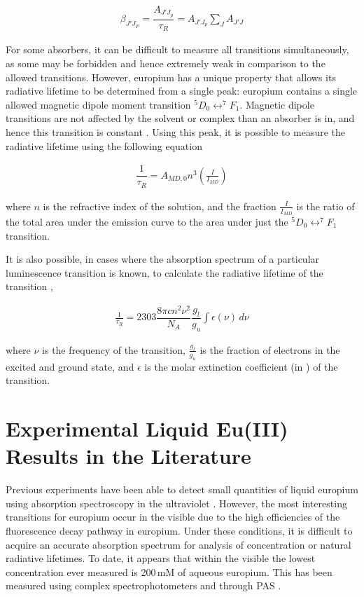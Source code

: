 \begin{align}
  \beta_{J'J_P} = \dfrac{A_{J'J_p}}{\tau_R} = A_{J'J_p}\sum_J A_{J'J} \label{eq:branch_ratio}
\end{align}

For some absorbers, it can be difficult to measure all transitions
simultaneously, as some may be forbidden and hence extremely weak in comparison
to the allowed transitions. However, europium has a unique property that allows
its radiative lifetime to be determined from a single peak: europium contains a
single allowed magnetic dipole moment transition $^5D_0 \leftrightarrow ^7F_1$.
Magnetic dipole transitions are not affected by the solvent or complex than an
absorber is in, and hence this transition is constant \cite{Werts:2002fs}.
Using this peak, it is possible to measure the radiative lifetime using the
following equation

\begin{align}
  \dfrac{1}{\tau_R} = A_{MD,0}n^3\left(\frac{I}{I_{MD}}\right) \label{eq:nat_life_eu}
\end{align}

where $n$ is the refractive index of the solution, and the fraction
$\frac{I}{I_{MD}}$ is the ratio of the total area under the emission curve to
the area under just the $^5D_0 \leftrightarrow ^7F_1$ transition.

It is also possible, in cases where the absorption spectrum of a particular
luminescence transition is known, to calculate the radiative lifetime of the
transition \cite{Lewis:1945tp},

\begin{align}
  \frac{1}{\tau_R} = 2303 \dfrac{8\pi c n ^2 \nu^2}{N_A}\dfrac{g_l}{g_u}\int\epsilon(\nu)\,d\nu \label{eq:nat_life_abs}
\end{align}

where $\nu$ is the frequency of the transition, $\tfrac{g_l}{g_u}$ is the
fraction of electrons in the excited and ground state, and $\epsilon$ is the
molar extinction coefficient (in \iM\icm) of the transition.



\section{Experimental Liquid Eu(III) Results in the Literature}\label{sec:previous_eu_results}

Previous experiments have been able to detect small quantities of liquid
europium using absorption spectroscopy in the ultraviolet \cite{Yun:2001wc}.
However, the most interesting transitions for europium occur in the visible due
to the high efficiencies of the fluorescence decay pathway in europium. Under
these conditions, it is difficult to acquire an accurate absorption spectrum
for analysis of concentration or natural radiative lifetimes. To date, it
appears that within the visible the lowest concentration ever measured is
200\,mM of aqueous europium. This has been measured using complex
spectrophotometers and through \ac{PAS} \cite{Sawada:1979vca}.

